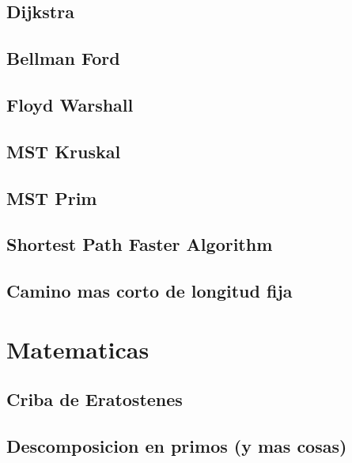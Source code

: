 \subsection{Dijkstra}
\raggedbottom
\hrulefill
\subsection{Bellman Ford}
\raggedbottom
\hrulefill
\subsection{Floyd Warshall}
\raggedbottom
\hrulefill
\subsection{MST Kruskal}
\raggedbottom
\hrulefill
\subsection{MST Prim}
\raggedbottom
\hrulefill
\subsection{Shortest Path Faster Algorithm}
\raggedbottom
\hrulefill
\subsection{Camino mas corto de longitud fija}
\raggedbottom
\hrulefill

\section{Matematicas}
\subsection{Criba de Eratostenes}
\raggedbottom
\hrulefill
\subsection{Descomposicion en primos (y mas cosas)}
\raggedbottom
\hrulefill
